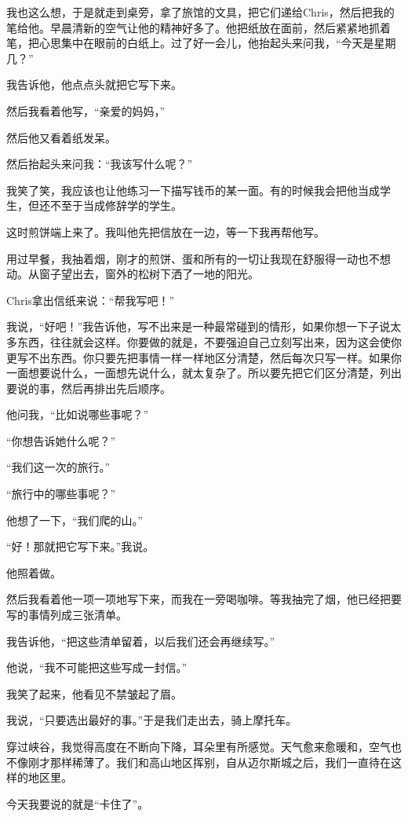 \documentclass[UTF8]{article}
\begin{document}
\par 我也这么想，于是就走到桌旁，拿了旅馆的文具，把它们递给Chris，然后把我的笔给他。早晨清新的空气让他的精神好多了。他把纸放在面前，然后紧紧地抓着笔，把心思集中在眼前的白纸上。过了好一会儿，他抬起头来问我，“今天是星期几？”
\par 我告诉他，他点点头就把它写下来。
\par 然后我看着他写，“亲爱的妈妈，”
\par 然后他又看着纸发呆。
\par 然后抬起头来问我：“我该写什么呢？”
\par 我笑了笑，我应该也让他练习一下描写钱币的某一面。有的时候我会把他当成学生，但还不至于当成修辞学的学生。
\par 这时煎饼端上来了。我叫他先把信放在一边，等一下我再帮他写。
\par 用过早餐，我抽着烟，刚才的煎饼、蛋和所有的一切让我现在舒服得一动也不想动。从窗子望出去，窗外的松树下洒了一地的阳光。
\par Chris拿出信纸来说：“帮我写吧！”
\par 我说，“好吧！”我告诉他，写不出来是一种最常碰到的情形，如果你想一下子说太多东西，往往就会这样。你要做的就是，不要强迫自己立刻写出来，因为这会使你更写不出东西。你只要先把事情一样一样地区分清楚，然后每次只写一样。如果你一面想要说什么，一面想先说什么，就太复杂了。所以要先把它们区分清楚，列出要说的事，然后再排出先后顺序。
\par 他问我，“比如说哪些事呢？”
\par “你想告诉她什么呢？”
\par “我们这一次的旅行。”
\par “旅行中的哪些事呢？”
\par 他想了一下，“我们爬的山。”
\par “好！那就把它写下来。”我说。
\par 他照着做。
\par 然后我看着他一项一项地写下来，而我在一旁喝咖啡。等我抽完了烟，他已经把要写的事情列成三张清单。
\par 我告诉他，“把这些清单留着，以后我们还会再继续写。”
\par 他说，“我不可能把这些写成一封信。”
\par 我笑了起来，他看见不禁皱起了眉。
\par 我说，“只要选出最好的事。”于是我们走出去，骑上摩托车。
\par 穿过峡谷，我觉得高度在不断向下降，耳朵里有所感觉。天气愈来愈暖和，空气也不像刚才那样稀薄了。我们和高山地区挥别，自从迈尔斯城之后，我们一直待在这样的地区里。
\par 今天我要说的就是“卡住了”。
\end{document}
